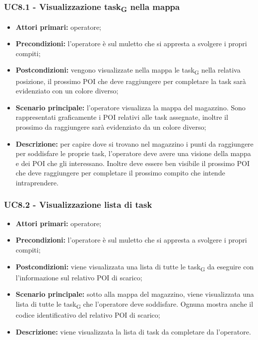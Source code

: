 \subsubsection{UC8.1 - Visualizzazione task\textsubscript{G} nella mappa}
\begin{itemize}
	\item 	\textbf{Attori primari:} operatore;
	\item 	\textbf{Precondizioni:} l'operatore è sul muletto che si appresta a svolgere i propri compiti;
	\item 	\textbf{Postcondizioni:} vengono visualizzate nella mappa le task\textsubscript{G} nella relativa posizione, il prossimo POI che deve raggiungere per completare la task sarà evidenziato con un colore diverso;
	\item 	\textbf{Scenario principale:} l'operatore visualizza la mappa del magazzino. Sono rappresentati graficamente i POI relativi alle task assegnate, inoltre il prossimo da raggiungere sarà evidenziato da un colore diverso;
	\item 	\textbf{Descrizione:} per capire dove si trovano nel magazzino i punti da raggiungere per soddisfare le proprie task, l'operatore deve avere una visione della mappa e dei POI che gli interessano. Inoltre deve essere ben visibile il prossimo POI che deve raggiungere per completare il prossimo compito che intende intraprendere.
\end{itemize}



\subsubsection{UC8.2 - Visualizzazione lista di task}
\begin{itemize}
	\item 	\textbf{Attori primari:} operatore;
	\item 	\textbf{Precondizioni:} l'operatore è sul muletto che si appresta a svolgere i propri compiti;
	\item 	\textbf{Postcondizioni:} viene visualizzata una lista di tutte le task\textsubscript{G} da eseguire con l'informazione sul relativo POI di scarico;
	\item 	\textbf{Scenario principale:} sotto alla mappa del magazzino, viene visualizzata una lista di tutte le task\textsubscript{G} che l'operatore deve soddisfare. Ognuna mostra anche il codice identificativo del relativo POI di scarico;
	\item 	\textbf{Descrizione:} viene visualizzata la lista di task da completare da l'operatore.
\end{itemize}

